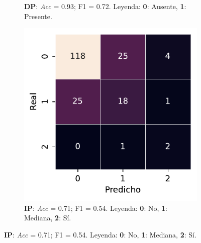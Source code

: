 \begin{figure}[htbp]
\begin{subfigure}[t]{0.3\textwidth}
        \caption{\textbf{DP}: \textit{Acc} = 0.93; F1 = 0.72. Leyenda: \textbf{0}: Ausente, \textbf{1}: Presente.}
        \label{fig5:DP_confusion_matrix}
    \end{subfigure}  
    \begin{subfigure}[t]{0.3\textwidth}
        \includegraphics[width=\textwidth]{figures/5_experiments/single-ip-cm.pdf}
        \caption{\textbf{IP}: \textit{Acc} = 0.71; F1 =  0.54. Leyenda: \textbf{0}: No, \textbf{1}: Mediana, \textbf{2}: Sí.}
        \label{fig5:IP_confusion_matrix}


\end{subfigure}
\end{figure}
